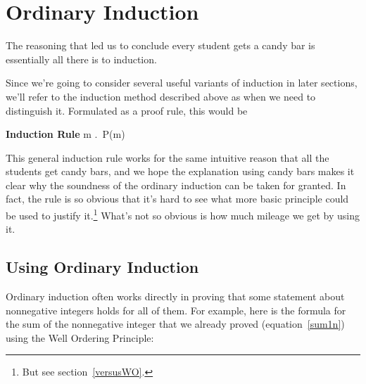 \section{Ordinary Induction}

The reasoning that led us to conclude every student gets a candy bar is 
essentially all there is to induction.
\iffalse
So our claim that all the Professor's students get a candy bar was simply
an application of the Induction Rule with $P(n)$ defined to be the
predicate, ``student $n$ gets a candy bar.''
\fi

Since we're going to consider several useful variants of induction in
later sections, we'll refer to the induction method described above as
 when we need to distinguish it.  Formulated as 
a proof rule, this would be
\begin{rul*} \textbf{Induction Rule}
{\forall m \in \naturals.\, P(m)}
\end{rul*}

This general induction rule works for the same intuitive reason that all
the students get candy bars, and we hope the explanation using candy bars
makes it clear why the soundness of the ordinary induction can be taken
for granted.  In fact, the rule is so obvious that it's hard to see what
more basic principle could be used to justify it.\footnote{But see
section~\ref{versusWO}.}  What's not so obvious is how much mileage 
we get by using it.

\subsection{Using Ordinary Induction}

Ordinary induction often works directly in proving that some statement
about nonnegative integers holds for all of them.  For example, here is
the formula for the sum of the nonnegative integer that we already proved
(equation~\eqref{sum1n}) using the Well Ordering Principle:

